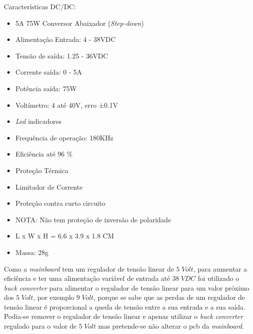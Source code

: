 \begin{minipage}[!b]{.5\linewidth}
\small
Características DC/DC:
	\begin{itemize}
		\setlength\itemsep{-0.5em}
		\footnotesize
		\item 5A 75W Conversor Abaixador (\textit{Step-down})
		\item Alimentação Entrada: 4 - 38VDC
		\item Tensão de saída: 1.25 - 36VDC
		\item Corrente saída: 0 - 5A
		\item Potência saída: 75W
		\item Voltímetro: 4 até 40V, erro ±0.1V
		\item \textit{Led} indicadores
		\item Frequência de operação: 180KHz
		\item Eficiência até 96 \%
		\item Proteção Térmica
		\item Limitador de Corrente
		\item Proteção contra curto circuito
		\item NOTA: Não tem proteção de inversão de polaridade
		\item L x W x H = 6.6 x 3.9 x 1.8 CM
		\item Massa: 28g
	\end{itemize}
\end{minipage}
Como a \textit{mainboard} tem um regulador de tensão linear de $5 \; Volt$, para aumentar a eficiência e ter uma alimentação variável de entrada até $38 \; VDC$ foi utilizado o \textit{buck converter} para alimentar o regulador de tensão linear para um valor próximo dos $5 \; Volt$, por exemplo $9 \; Volt$, porque se sabe que as perdas de um regulador de tensão linear é proporcional a queda de tensão entre a sua entrada e a sua saída. Podia-se remover o regulador de tensão linear e apenas utilizar o \textit{buck converter} regulado para o valor de $5 \; Volt$ mas pretende-se não alterar o \acs{pcb} da \textit{mainboard}.
\newpage
